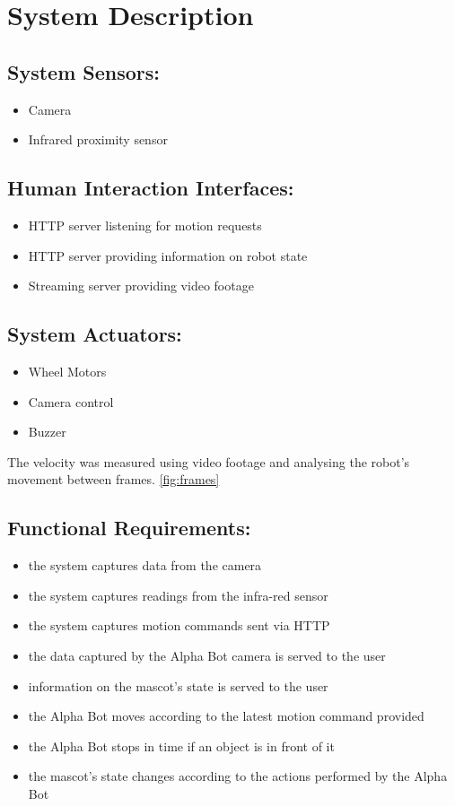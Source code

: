 \documentclass[conference]{IEEEtran}
\begin{document}
\section{System Description}

\subsection{System Sensors:}
\begin{itemize}
    \item Camera
    \item Infrared proximity sensor
\end{itemize}

\subsection{Human Interaction Interfaces:}
\begin{itemize}
    \item HTTP server listening for motion requests
    \item HTTP server providing information on robot state
    \item Streaming server providing video footage
\end{itemize}

\subsection{System Actuators:}
\begin{itemize}
    \item Wheel Motors
    \item Camera control
    \item Buzzer
\end{itemize}

The velocity was measured using video footage and analysing the robot's movement between frames. \ref{fig:frames}

\subsection{Functional Requirements:}

\begin{itemize}
    \item the system captures data from the camera
    \item the system captures readings from the infra-red sensor
    \item the system captures motion commands sent via HTTP 
    \item the data captured by the Alpha Bot camera is served to the user
    \item information on the mascot's state is served to the user
    \item the Alpha Bot moves according to the latest motion command provided
    \item the Alpha Bot stops in time if an object is in front of it
    \item the mascot's state changes according to the actions performed by the Alpha Bot
\end{itemize}
\end{document}
